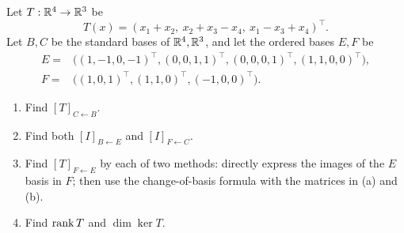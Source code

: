 \begin{problem}\label{ex:04:both-bases}
Let \(T:\mathbb R^4\to\mathbb R^3\) be
\[
T(x)=(x_1+x_2,\ x_2+x_3-x_4,\ x_1-x_3+x_4)^\top.
\]
Let \(B,C\) be the standard bases of \(\mathbb R^4,\mathbb R^3\), and let the ordered bases \(E,F\) be
\[
\begin{split}
E={}&\bigl((1,-1,0,-1)^\top,(0,0,1,1)^\top,
             (0,0,0,1)^\top,(1,1,0,0)^\top\bigr),\\
F={}&\bigl((1,0,1)^\top,(1,1,0)^\top,(-1,0,0)^\top\bigr).
\end{split}
\]
\begin{enumerate}
\item Find \([T]_{C\leftarrow B}\).
\item Find both \([I]_{B\leftarrow E}\) and \([I]_{F\leftarrow C}\).
\item Find \([T]_{F\leftarrow E}\) by each of two methods:
directly express the images of the \(E\) basis in \(F\);
then use the change-of-basis formula with the matrices in (a) and (b).
\item Find \(\operatorname{rank} T\) and \(\dim\ker T\).
\end{enumerate}
\end{problem}
